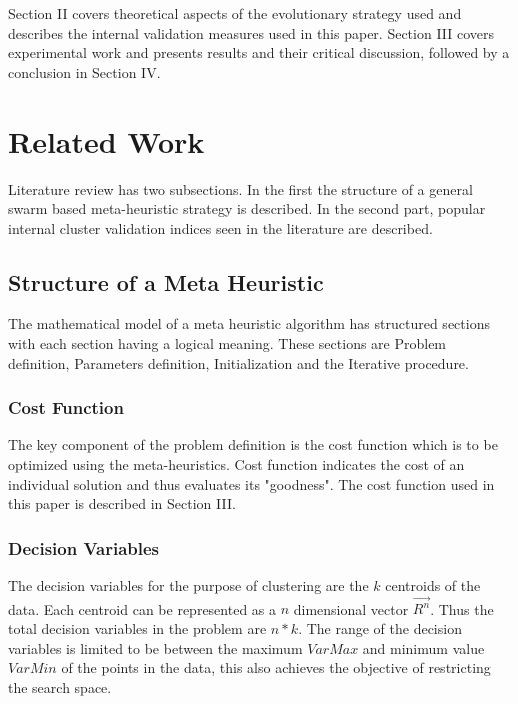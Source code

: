 \documentclass{svproc}
\begin{document}
Section II covers theoretical aspects of the evolutionary strategy used and describes the internal validation measures used in this paper. Section III covers experimental work and presents results and their critical discussion, followed by a conclusion in Section IV.\\ 

\section{Related Work}
Literature review has two subsections. In the first the structure of a general swarm based meta-heuristic strategy is described. In the second part, popular internal cluster validation indices seen in the literature are described.\\

\subsection{Structure of a Meta Heuristic}
The mathematical model of a meta heuristic algorithm has structured sections with each section having a logical meaning. These sections are Problem definition, Parameters definition, Initialization and the Iterative procedure.

\subsubsection{Cost Function} 
The key component of the problem definition is the cost function which is to be optimized using the meta-heuristics. Cost function indicates the cost of an individual solution and thus evaluates its "goodness". The cost function used in this paper is described in Section III.

\subsubsection{Decision Variables} 
The decision variables for the purpose of clustering are the $k$ centroids of the data. Each centroid can be represented as a $n$ dimensional vector $\overrightarrow{R^n}$. Thus the total decision variables in the problem are $n * k$. The range of the decision variables is limited to be between the maximum $VarMax$ and minimum value $VarMin$ of the points in the data, this also achieves the objective of restricting the search space. 
\end{document}

